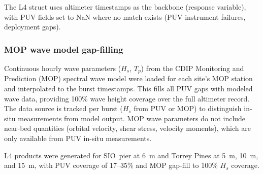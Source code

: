 The L4 struct uses altimeter timestamps as the backbone (response
variable), with PUV fields set to NaN where no match exists (PUV
instrument failures, deployment gaps).

\subsubsection{MOP wave model gap-filling}

Continuous hourly wave parameters ($H_s$, $T_p$) from the CDIP
Monitoring and Prediction (MOP) spectral wave model were loaded for
each site's MOP station and interpolated to the burst timestamps.
This fills all PUV gaps with modeled wave data, providing 100\%
wave height coverage over the full altimeter record. The data source
is tracked per burst ($H_s$ from PUV or MOP) to distinguish
in-situ measurements from model output. MOP wave parameters do not
include near-bed quantities (orbital velocity, shear stress, velocity
moments), which are only available from PUV in-situ measurements.

L4 products were generated for SIO~pier at \SI{6}{\meter} and Torrey
Pines at \SI{5}{\meter}, \SI{10}{\meter}, and \SI{15}{\meter}, with
PUV coverage of 17--35\% and MOP gap-fill to 100\% $H_s$ coverage.

